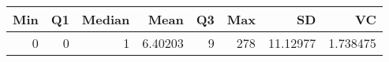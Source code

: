
\begin{tabular}[t]{rrrrrrrr}
\toprule
Min & Q1 & Median & Mean & Q3 & Max & SD & VC\\
\midrule
0 & 0 & 1 & 6.40203 & 9 & 278 & 11.12977 & 1.738475\\
\bottomrule
\end{tabular}